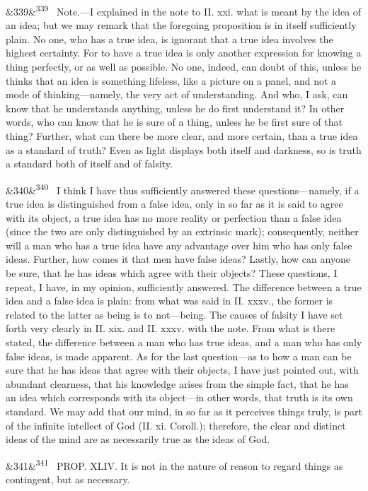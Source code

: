 \documentclass[12pt]{article}
\newcommand{\para}[1][]{\par\noindent\ifx&#1&\else\textsuperscript{\footnotesize #1}~\fi}
\begin{document}
\para[339] Note.---I explained in the note to II. xxi. what is meant by the idea of an idea; but we may remark that the foregoing proposition is in itself sufficiently plain. No one, who has a true idea, is ignorant that a true idea involves the highest certainty. For to have a true idea is only another expression for knowing a thing perfectly, or as well as possible. No one, indeed, can doubt of this, unless he thinks that an idea is something lifeless, like a picture on a panel, and not a mode of thinking---namely, the very act of understanding. And who, I ask, can know that he understands anything, unless he do first understand it? In other words, who can know that he is sure of a thing, unless he be first sure of that thing? Further, what can there be more clear, and more certain, than a true idea as a standard of truth? Even as light displays both itself and darkness, so is truth a standard both of itself and of falsity.

\para[340] I think I have thus sufficiently answered these questions---namely, if a true idea is distinguished from a false idea, only in so far as it is said to agree with its object, a true idea has no more reality or perfection than a false idea (since the two are only distinguished by an extrinsic mark); consequently, neither will a man who has a true idea have any advantage over him who has only false ideas. Further, how comes it that men have false ideas? Lastly, how can anyone be sure, that he has ideas which agree with their objects? These questions, I repeat, I have, in my opinion, sufficiently answered. The difference between a true idea and a false idea is plain: from what was said in II. xxxv., the former is related to the latter as being is to not---being. The causes of falsity I have set forth very clearly in II. xix. and II. xxxv. with the note. From what is there stated, the difference between a man who has true ideas, and a man who has only false ideas, is made apparent. As for the last question---as to how a man can be sure that he has ideas that agree with their objects, I have just pointed out, with abundant clearness, that his knowledge arises from the simple fact, that he has an idea which corresponds with its object---in other words, that truth is its own standard. We may add that our mind, in so far as it perceives things truly, is part of the infinite intellect of God (II. xi. Coroll.); therefore, the clear and distinct ideas of the mind are as necessarily true as the ideas of God.

\para[341] PROP. XLIV. It is not in the nature of reason to regard things as contingent, but as necessary.
\end{document}
